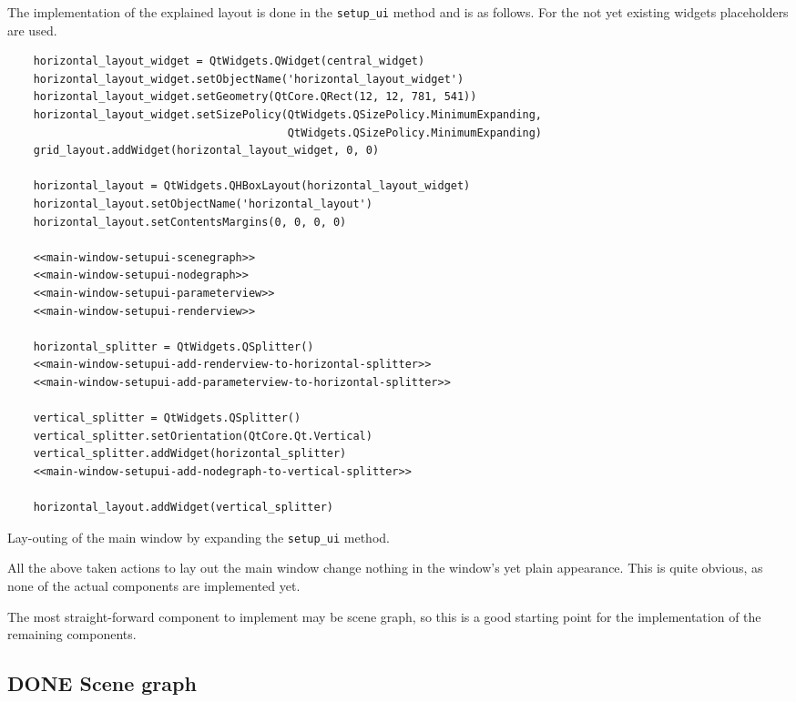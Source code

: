 \documentclass[10pt, openright, notitlepage]{scrreprt}
\begin{document}
The implementation of the explained layout is done in the \texttt{setup\_ui} method and
is as follows. For the not yet existing widgets placeholders are used.

\begin{listing}[H]
\begin{verbatim}
    horizontal_layout_widget = QtWidgets.QWidget(central_widget)
    horizontal_layout_widget.setObjectName('horizontal_layout_widget')
    horizontal_layout_widget.setGeometry(QtCore.QRect(12, 12, 781, 541))
    horizontal_layout_widget.setSizePolicy(QtWidgets.QSizePolicy.MinimumExpanding,
                                           QtWidgets.QSizePolicy.MinimumExpanding)
    grid_layout.addWidget(horizontal_layout_widget, 0, 0)

    horizontal_layout = QtWidgets.QHBoxLayout(horizontal_layout_widget)
    horizontal_layout.setObjectName('horizontal_layout')
    horizontal_layout.setContentsMargins(0, 0, 0, 0)

    <<main-window-setupui-scenegraph>>
    <<main-window-setupui-nodegraph>>
    <<main-window-setupui-parameterview>>
    <<main-window-setupui-renderview>>

    horizontal_splitter = QtWidgets.QSplitter()
    <<main-window-setupui-add-renderview-to-horizontal-splitter>>
    <<main-window-setupui-add-parameterview-to-horizontal-splitter>>

    vertical_splitter = QtWidgets.QSplitter()
    vertical_splitter.setOrientation(QtCore.Qt.Vertical)
    vertical_splitter.addWidget(horizontal_splitter)
    <<main-window-setupui-add-nodegraph-to-vertical-splitter>>

    horizontal_layout.addWidget(vertical_splitter)
\end{verbatim}
\caption{\label{main-window-setupui}
Lay-outing of the main window by expanding the \texttt{setup\_ui} method.}
\end{listing}

All the above taken actions to lay out the main window change nothing in the
window's yet plain appearance. This is quite obvious, as none of the actual
components are implemented yet.

The most straight-forward component to implement may be scene graph, so this is
a good starting point for the implementation of the remaining components.
\subsection{{\bfseries\sffamily DONE} Scene graph}
\label{sec:org5cb8369}
\end{document}
